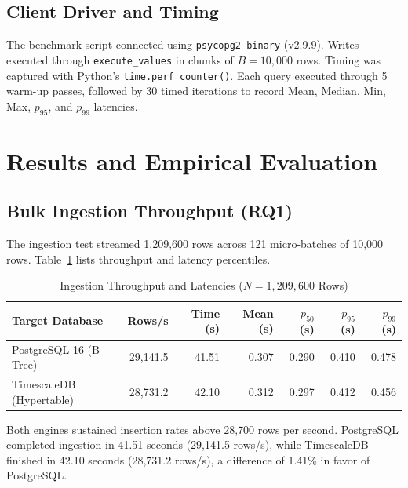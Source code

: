 \documentclass[conference,a4paper]{IEEEtran}
\newcommand{\code}[1]{\texttt{\small #1}}
\begin{document}
\subsection{Client Driver and Timing}
The benchmark script connected using \code{psycopg2-binary} (v2.9.9). Writes executed through \code{execute\_values} in chunks of $B = 10{,}000$ rows. Timing was captured with Python's \code{time.perf\_counter()}. Each query executed through 5 warm-up passes, followed by 30 timed iterations to record Mean, Median, Min, Max, $p_{95}$, and $p_{99}$ latencies.

\section{Results and Empirical Evaluation}

\subsection{Bulk Ingestion Throughput (RQ1)}
The ingestion test streamed 1,209,600 rows across 121 micro-batches of 10,000 rows. Table~\ref{tab:ingestion_metrics} lists throughput and latency percentiles.

\begin{table}[t]
\caption{Ingestion Throughput and Latencies ($N = 1{,}209{,}600$ Rows)}
\label{tab:ingestion_metrics}
\centering
\footnotesize
\setlength{\tabcolsep}{3.2pt}
\begin{tabular}{@{}lrrrrrr@{}}
\toprule
\textbf{Target Database} & \textbf{Rows/s} & \textbf{Time (s)} & \textbf{Mean (s)} & \textbf{$p_{50}$ (s)} & \textbf{$p_{95}$ (s)} & \textbf{$p_{99}$ (s)} \\ \midrule
PostgreSQL 16 (B-Tree) & 29,141.5 & 41.51 & 0.307 & 0.290 & 0.410 & 0.478 \\
TimescaleDB (Hypertable) & 28,731.2 & 42.10 & 0.312 & 0.297 & 0.412 & 0.456 \\ \bottomrule
\end{tabular}
\end{table}

Both engines sustained insertion rates above 28,700 rows per second. PostgreSQL completed ingestion in 41.51 seconds (29,141.5 rows/s), while TimescaleDB finished in 42.10 seconds (28,731.2 rows/s), a difference of 1.41\% in favor of PostgreSQL.
\end{document}

